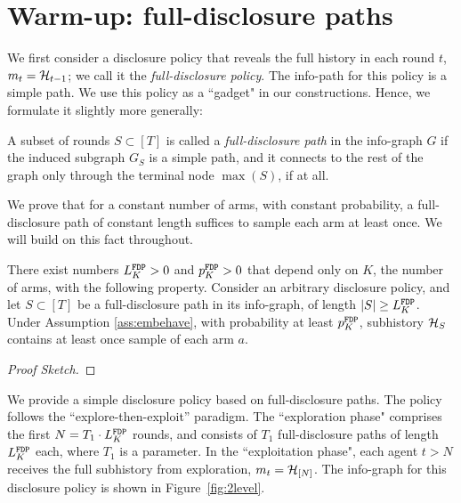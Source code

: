 \section{Warm-up: full-disclosure paths}

We first consider a disclosure policy that reveals the full history in each round $t$, \ie $m_t=\mathcal{H}_{t-1}$; we call it the \emph{full-disclosure policy}. The info-path for this policy is a simple path. We use this policy as a ``gadget" in our constructions. Hence, we formulate it slightly more generally:
  
\begin{definition}
A subset of rounds $S\subset [T]$ is called a \emph{full-disclosure path} in the  info-graph $G$ if the induced subgraph $G_S$ is a simple path, and it connects to the rest of the graph only through the terminal node $\max(S)$, if at all.
\end{definition}
  
We prove that for a constant number of arms, with constant probability, a full-disclosure path of constant length suffices to sample each arm at least once. We will build on this fact throughout.

\begin{lemma}\label{lem:greedy}
There exist numbers $L^\mathtt{FDP}_K>0$ and $p^\mathtt{FDP}_K>0$ that depend only on $K$, the number of arms, with the following property. Consider an arbitrary disclosure policy, and let $S\subset [T]$ be a full-disclosure path in its info-graph, of length $|S|\geq L^\mathtt{FDP}_K$. Under Assumption \ref{ass:embehave}, with probability at least $p^\mathtt{FDP}_K$, subhistory $\mathcal{H}_{S}$ contains at least once sample of each arm $a$.
\end{lemma}

\begin{proof}[Proof Sketch]
\end{proof}


We provide a simple disclosure policy based on full-disclosure paths. The policy follows the ``explore-then-exploit'' paradigm. The ``exploration phase" comprises the first $N = T_1\cdot L^\mathtt{FDP}_K$ rounds, and consists of $T_1$ full-disclosure paths of length $L^\mathtt{FDP}_K$ each, where $T_1$ is a parameter. In the ``exploitation phase", each agent $t>N$ receives the full subhistory from exploration, \ie $m_t = \mathcal{H}_{[N]}$. The info-graph for this disclosure policy is shown in Figure~\ref{fig:2level}.

